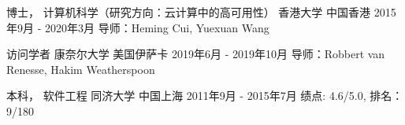 

\begin{cventries}


\cventry
{博士， 计算机科学（研究方向：云计算中的高可用性）} %
{香港大学} %
{中国香港} %
{2015年9月 - 2020年3月} %
{ %
导师：Heming Cui, Yuexuan Wang
}


\cventry
{访问学者} %
{康奈尔大学} %
{美国伊萨卡} %
{2019年6月 - 2019年10月} %
{ %
导师：Robbert van Renesse, Hakim Weatherspoon
}


\cventry
{本科， 软件工程} %
{同济大学} %
{中国上海} %
{2011年9月 - 2015年7月} %
{ %
绩点: 4.6/5.0, 排名：9/180
}

\end{cventries}
